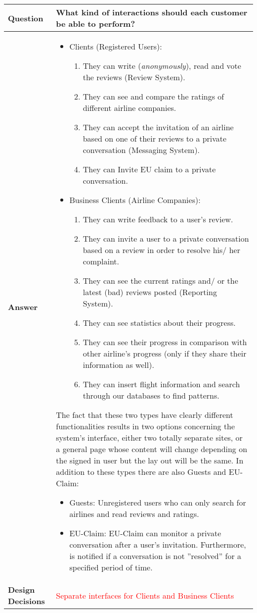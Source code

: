 \begin{longtable}{| l |  p{12cm} |}
\hline
\textbf{Question} & \textbf{What kind of interactions should each customer be able to perform?}  \\ \hline
\textbf{Answer} &\begin{itemize}
\item Clients (Registered Users):
	\begin{enumerate}
		\item They can write ({\em anonymously}), read and vote the reviews (Review System).
       		 \item They can see and compare the ratings of different airline companies.
        	\item They can accept the invitation of an airline based on one of their reviews to a private conversation (Messaging System). 
		\item They can Invite EU claim to a private conversation.
	\end{enumerate}
\item Business Clients (Airline Companies):
	\begin{enumerate}
		\item They can write feedback to a user's review.
		\item They can invite a user to a private conversation based on a review in order to resolve his/ her complaint.
		\item They can see the current ratings and/ or the latest (bad) reviews posted (Reporting System).
		\item They can see statistics about their progress.
		\item They can see their progress in comparison with other airline's progress (only if they share their information as well).
		\item They can insert flight information and search through our databases to find patterns.
	\end{enumerate}
\end{itemize} 
The fact that these two types have clearly different functionalities results in two options concerning the system's interface, either two totally separate sites, or a general page whose content will change depending on the signed in user but the lay out will be the same.
In addition to these types there are also Guests and EU-Claim:
	\begin{itemize}
 	\item Guests: Unregistered users who can only search for airlines and read reviews and ratings.
 	\item EU-Claim: EU-Claim can monitor a private conversation after a user's invitation. Furthermore, is notified if a conversation is not ''resolved'' for a specified period of time.
	\end{itemize}
\\ \hline
\textbf{Design Decisions} & \textcolor{red}{Separate interfaces for Clients and Business Clients} \\ \hline
\end{longtable}



